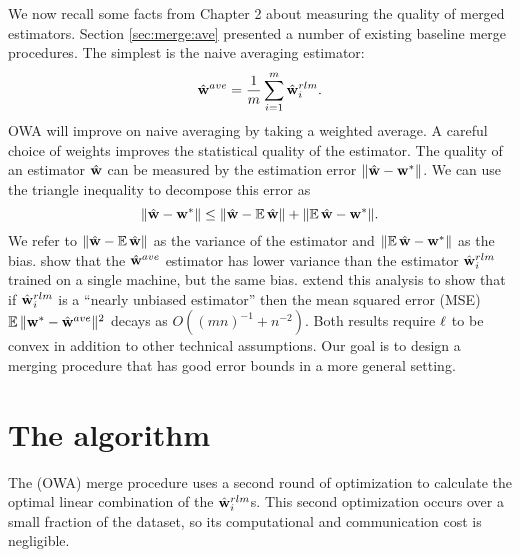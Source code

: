 \documentclass[thesis.tex]{subfiles}
\begin{document}
We now recall some facts from Chapter 2 about measuring the quality of merged estimators.
Section \ref{sec:merge:ave} presented a number of existing baseline merge procedures.
The simplest is the naive averaging estimator:
\begin{equation}
\hat{\mathbf w}^{ave} = \frac{1}{m}\sum_{i=1}^m \hat{\mathbf w}^{rlm}_i
.
\end{equation}
OWA will improve on naive averaging by taking a weighted average.
A careful choice of weights improves the statistical quality of the estimator.
The quality of an estimator ${\hat{\mathbf w}}$ can be measured by the estimation error ${\lVert {{\hat{\mathbf w}}-{\mathbf w^{*}}} \rVert}$. 
We can use the triangle inequality to decompose this error as
\begin{equation}
{\lVert {{\hat{\mathbf w}}-{\mathbf w^{*}}} \rVert} \le {\lVert {{\hat{\mathbf w}}-\operatorname*{\mathbb E}{\hat{\mathbf w}}} \rVert}+ {\lVert {\operatorname*{\mathbb E}{\hat{\mathbf w}}- {\mathbf w^{*}}} \rVert} .
\end{equation}
We refer to ${\lVert {{\hat{\mathbf w}}-\operatorname*{\mathbb E}{\hat{\mathbf w}}} \rVert}$ as the variance of the estimator and ${\lVert {\operatorname*{\mathbb E}{\hat{\mathbf w}}-{\mathbf w^{*}}} \rVert}$ as the bias.
\citet{mcdonald2009efficient} show that the $\hat{\mathbf w}^{ave}$ estimator has lower variance than the estimator $\hat{\mathbf w}^{rlm}_i$ trained on a single machine, but the same bias.
\citet{zhang2012communication} extend this analysis to show that if $\hat{\mathbf w}^{rlm}_i$ is a ``nearly unbiased estimator'' then the mean squared error (MSE) $\operatorname*{\mathbb E}{\lVert {{\mathbf w^{*}}-\hat{\mathbf w}^{ave}} \rVert}{}^2$ decays as $O((mn)^{-1} + n^{-2})$.
Both results require $\ell$ to be convex in addition to other technical assumptions.
Our goal is to design a merging procedure that has good error bounds in a more general setting.


\section{The algorithm}
\label{sec:owa:alg}

The  (OWA) merge procedure uses a second round of optimization to calculate the optimal linear combination of the $\hat{\mathbf w}^{rlm}_i$s.
This second optimization occurs over a small fraction of the dataset,
so its computational and communication cost is negligible.
\end{document}
